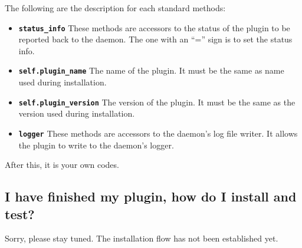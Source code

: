 \documentclass{article}
\begin{document}
The following are the description for each standard methods:

\begin{itemize}
   \item \textbf{\texttt{status\_info}} These methods are accessors to the status of the plugin to be reported back to the daemon. The one with an ``='' sign is to set the status info. 
   \item \textbf{\texttt{self.plugin\_name}} The name of the plugin. It must be the same as name used during installation. 
   \item \textbf{\texttt{self.plugin\_version}} The version of the plugin. It must be the same as the version used during installation. 
   \item \textbf{\texttt{logger}} These methods are accessors to the daemon's log file writer. It allows the plugin to write to the daemon's logger. 
\end{itemize}

After this, it is your own codes. 

\subsection*{I have finished my plugin, how do I install and test?}

Sorry, please stay tuned. The installation flow has not been established yet. 
\end{document}

